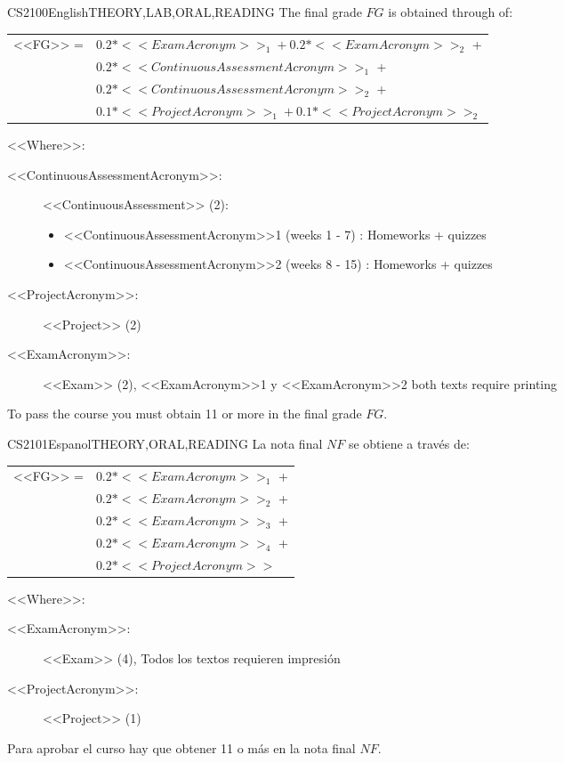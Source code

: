  \begin{evaluation}{CS2100}{English}{THEORY,LAB,ORAL,READING}
  The final grade $FG$ is obtained through of:
 
  \begin{tabular}{cl}
      <<FG>> = & $0.2*<<ExamAcronym>>_{1} + 0.2*<<ExamAcronym>>_{2}$ + \\
               & $0.2*<<ContinuousAssessmentAcronym>>_{1}$ + \\
               & $0.2*<<ContinuousAssessmentAcronym>>_{2}$ + \\
               & $0.1*<<ProjectAcronym>>_{1} + 0.1*<<ProjectAcronym>>_{2}$
  \end{tabular}
 
  \noindent <<Where>>:
  \begin{description}
   \item[<<ContinuousAssessmentAcronym>>:] <<ContinuousAssessment>> (2):
   \begin{itemize}
             \item  <<ContinuousAssessmentAcronym>>1 (weeks 1 - 7) : Homeworks + quizzes
              \item <<ContinuousAssessmentAcronym>>2 (weeks 8 - 15) : Homeworks + quizzes
       \end{itemize}
   \item[<<ProjectAcronym>>:] <<Project>> (2)
   \item[<<ExamAcronym>>:] <<Exam>> (2), <<ExamAcronym>>1 y <<ExamAcronym>>2 both texts require printing
  \end{description}
  \noindent To pass the course you must obtain 11 or more in the final grade $FG$.
  \end{evaluation}
 

  \begin{evaluation}{CS2101}{Espanol}{THEORY,ORAL,READING}
  La nota final $NF$ se obtiene a través de:
 
  \begin{tabular}{cl}
      <<FG>> = & $0.2* <<ExamAcronym>>_{1}$ + \\
               & $0.2* <<ExamAcronym>>_{2}$ + \\
               & $0.2* <<ExamAcronym>>_{3}$ + \\
               & $0.2* <<ExamAcronym>>_{4}$ + \\
               & $0.2*<<ProjectAcronym>>$ \\


  \end{tabular}

    \noindent <<Where>>:
  \begin{description}
      \item[<<ExamAcronym>>:] <<Exam>> (4), Todos los textos requieren impresión
      \item[<<ProjectAcronym>>:] <<Project>> (1)
  \end{description}
  \noindent Para aprobar el curso hay que obtener 11 o más en la nota final $NF$.
  \end{evaluation}
 
